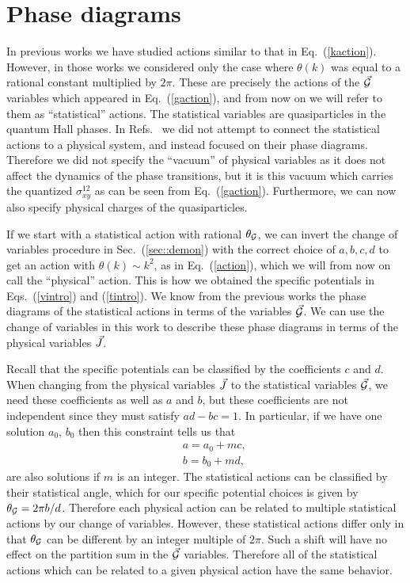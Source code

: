 \section{Phase diagrams}
\label{sec:reverse}

In previous works\cite{Loopy,short_range3,Gen2Loops} we have studied actions similar to that in Eq.~(\ref{kaction}). However, in those works we considered only the case where $\theta(k)$ was equal to a rational constant multiplied by $2\pi$. These are precisely the actions of the $\vec{\mathcal{G}}$ variables which appeared in Eq.~(\ref{gaction}), and from now on we will refer to them as ``statistical'' actions. The statistical variables are quasiparticles in the quantum Hall phases.  In Refs.~\cite{Loopy, short_range3} we did not attempt to connect the statistical actions to a physical system, and instead focused on their phase diagrams.  Therefore we did not specify the ``vacuum'' of physical variables as it does not affect the dynamics of the phase transitions, but it is this vacuum which carries the quantized $\sigma^{12}_{xy}$ as can be seen from Eq.~(\ref{gaction}).  Furthermore, we can now also specify physical charges of the quasiparticles.  

If we start with a statistical action with rational $\theta_{{\cal G}}$, we can invert the change of variables procedure in Sec.~(\ref{sec::demon}) with the correct choice of $a,b,c,d$ to get an action with $\theta(k)\sim k^2$, as in Eq.~(\ref{action}), which we will from now on call the ``physical'' action. This is how we obtained the specific potentials in Eqs.~(\ref{vintro}) and (\ref{tintro}). We know from the previous works the phase diagrams of the statistical actions in terms of the variables $\vec{\mathcal{G}}$. We can use the change of variables in this work to describe these phase diagrams in terms of the physical variables $\vec{J}$. 

Recall that the specific potentials can be classified by the coefficients $c$ and $d$. When changing from the physical variables $\vec{J}$ to the statistical variables $\vec{\mathcal{G}}$, we need these coefficients as well as $a$ and $b$, but these coefficients are not independent since they must satisfy $ad-bc=1$. In particular, if we have one solution $a_0$, $b_0$ then this constraint tells us that 
\begin{eqnarray}
&&a=a_0 + mc,\nonumber\\
&&b=b_0 + md,
\label{bshift} 
\end{eqnarray} 
are also solutions if $m$ is an integer.  The statistical actions can be classified by their statistical angle, which for our specific potential choices is given by $\theta_{\cal G}=2\pi b/d$. Therefore each physical action can be related to multiple statistical actions by our change of variables. However, these statistical actions differ only in that $\theta_{\cal G}$ can be different by an integer multiple of $2\pi$. Such a shift will have no effect on the partition sum in the $\vec{\mathcal{G}}$ variables. Therefore all of the statistical actions which can be related to a given physical action have the same behavior. 

